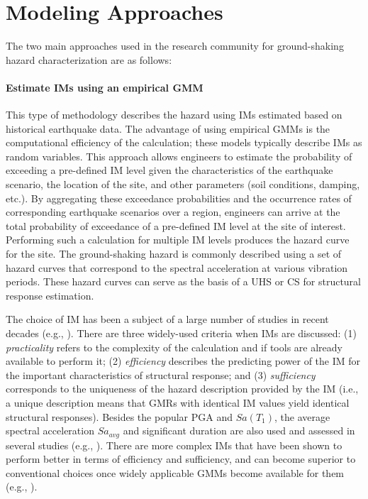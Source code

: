 \section{Modeling Approaches}
\label{sec:eq_shake_models}

The two main approaches used in the research community for ground-shaking hazard characterization are as follows:

\paragraph{Estimate IMs using an empirical GMM} This type of methodology describes the hazard using IMs estimated based on historical earthquake data. The advantage of using empirical GMMs is the computational efficiency of the calculation; these models typically describe IMs as random variables. This approach allows engineers to estimate the probability of exceeding a pre-defined IM level given the characteristics of the earthquake scenario, the location of the site, and other parameters (soil conditions, damping, etc.). By aggregating these exceedance probabilities and the occurrence rates of corresponding earthquake scenarios over a region, engineers can arrive at the total probability of exceedance of a pre-defined IM level at the site of interest. Performing such a calculation for multiple IM levels produces the hazard curve for the site. The ground-shaking hazard is commonly described using a set of hazard curves that correspond to the spectral acceleration at various vibration periods. These hazard curves can serve as the basis of a UHS or CS for structural response estimation.

The choice of IM has been a subject of a large number of studies in recent decades (e.g., \cite{shome1998earthquakes, luco2007structure}). There are three widely-used criteria when IMs are discussed: (1) \emph{practicality} refers to the complexity of the calculation and if tools are already available to perform it; (2) \emph{efficiency} describes the predicting power of the IM for the important characteristics of structural response; and (3) \emph{sufficiency} corresponds to the uniqueness of the hazard description provided by the IM (i.e., a unique description means that GMRs with identical IM values yield identical structural responses). Besides the popular PGA and $Sa(T_1)$, the average spectral acceleration $Sa_{avg}$ and significant duration are also used and assessed in several studies (e.g., \cite{bijelic2018validation}). There are more complex IMs that have been shown to perform better in terms of efficiency and sufficiency, and can become superior to conventional choices once widely applicable GMMs become available for them (e.g., \cite{davalos2019filtered}). 

